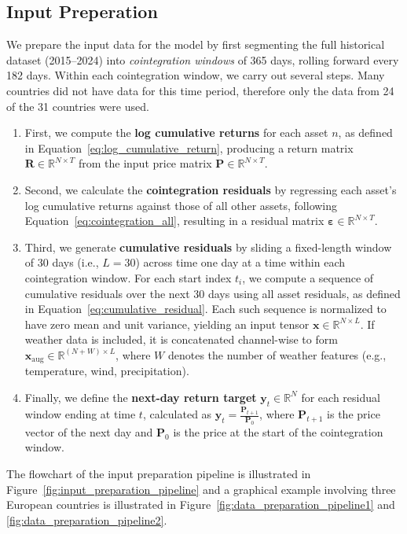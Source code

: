 \documentclass[12pt]{article}
\begin{document}
\subsection*{Input Preperation}

We prepare the input data for the model by first segmenting the full historical dataset (2015–2024) into \textit{cointegration windows} of 365 days, rolling forward every 182 days. Within each cointegration window, we carry out several steps. Many countries did not have data for this time period, therefore only the data from 24 of the 31 countries were used.
\begin{enumerate}  \itemsep5pt \parskip0pt
    \item First, we compute the \textbf{log cumulative returns} for each asset \( n \), as defined in Equation~\eqref{eq:log_cumulative_return}, producing a return matrix \( \mathbf{R} \in \mathbb{R}^{N \times T} \) from the input price matrix \( \mathbf{P} \in \mathbb{R}^{N \times T} \).
    \item Second, we calculate the \textbf{cointegration residuals} by regressing each asset’s log cumulative returns against those of all other assets, following Equation~\eqref{eq:cointegration_all}, resulting in a residual matrix \( \boldsymbol{\varepsilon} \in \mathbb{R}^{N \times T} \).
    \item Third, we generate \textbf{cumulative residuals} by sliding a fixed-length window of 30 days (i.e., \( L = 30 \)) across time one day at a time within each cointegration window. For each start index \( t_i \), we compute a sequence of cumulative residuals over the next 30 days using all asset residuals, as defined in Equation~\eqref{eq:cumulative_residual}. Each such sequence is normalized to have zero mean and unit variance, yielding an input tensor \( \mathbf{x} \in \mathbb{R}^{N \times L} \). If weather data is included, it is concatenated channel-wise to form \( \mathbf{x}_{\text{aug}} \in \mathbb{R}^{(N + W) \times L} \), where \( W \) denotes the number of weather features (e.g., temperature, wind, precipitation).
    \item Finally, we define the \textbf{next-day return target} \( \mathbf{y}_t \in \mathbb{R}^N \) for each residual window ending at time \( t \), calculated as \( \mathbf{y}_t = \frac{\mathbf{P}_{t+1}}{\mathbf{P}_0} \), where \( \mathbf{P}_{t+1} \) is the price vector of the next day and \( \mathbf{P}_0 \) is the price at the start of the cointegration window.
\end{enumerate}  
The flowchart of the input preparation pipeline is illustrated in Figure~\ref{fig:input_preparation_pipeline} and a graphical example involving three European countries is illustrated in Figure~\ref{fig:data_preparation_pipeline1} and \ref{fig:data_preparation_pipeline2}.
\end{document}
